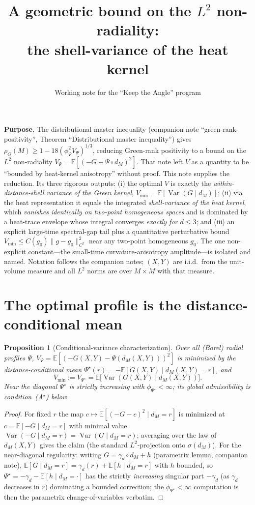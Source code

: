 \documentclass[11pt]{article}
\title{A geometric bound on the $L^2$ non-radiality:\\
the shell-variance of the heat kernel}
\author{Working note for the ``Keep the Angle'' program}
\date{}
\newtheorem{proposition}[theorem]{Proposition}
\theoremstyle{remark}
\newcommand{\dM}{d_M}
\newcommand{\rhoG}{\rho_G}
\newcommand{\Var}{\operatorname{Var}}
\newcommand{\E}{\mathbb E}
\begin{document}
\maketitle

\noindent\textbf{Purpose.} The distributional master inequality (companion note
``green-rank-positivity'', Theorem ``Distributional master inequality'') gives
$\rhoG(M)\ge1-18(\phi_\Psi^2V_\Psi)^{1/3}$, reducing Green-rank positivity to a bound on the
$L^2$ non-radiality $V_\Psi=\E[(-G-\Psi\circ\dM)^2]$. That note left $V$ as a quantity to be
``bounded by heat-kernel anisotropy'' without proof. This note supplies the reduction. Its
three rigorous outputs: (i) the optimal $V$ is exactly the \emph{within-distance-shell
variance of the Green kernel}, $V_{\min}=\E[\Var(G\mid\dM)]$; (ii) via the heat
representation it equals the integrated \emph{shell-variance of the heat kernel}, which
\emph{vanishes identically on two-point homogeneous spaces} and is dominated by a heat-trace
envelope whose integral converges \emph{exactly for $d\le3$}; and (iii) an explicit
large-time spectral-gap tail plus a quantitative perturbative bound
$V_{\min}\le C(g_0)\lVert g-g_0\rVert_{C^2}^2$ near any two-point homogeneous $g_0$. The one
non-explicit constant---the small-time curvature-anisotropy amplitude---is isolated and
named. Notation follows the companion notes; $(X,Y)$ are i.i.d.\ from the unit-volume
measure and all $L^2$ norms are over $M\times M$ with that measure.

\section{The optimal profile is the distance-conditional mean}

\begin{proposition}[Conditional-variance characterization]\label{prop:condvar}
Over all (Borel) radial profiles $\Psi$, $V_\Psi=\E[(-G(X,Y)-\Psi(\dM(X,Y)))^2]$ is minimized
by the distance-conditional mean $\Psi^\star(r)=-\E[G(X,Y)\mid\dM(X,Y)=r]$, and
\[
V_{\min}:=V_{\Psi^\star}=\E\bigl[\Var(G(X,Y)\mid\dM(X,Y))\bigr].
\]
Near the diagonal $\Psi^\star$ is strictly increasing with $\phi_{\Psi^\star}<\infty$; its
global admissibility is condition~\textup{(A$^\star$)} below.
\end{proposition}

\begin{proof}
For fixed $r$ the map $c\mapsto\E[(-G-c)^2\mid\dM=r]$ is minimized at $c=\E[-G\mid\dM=r]$
with minimal value $\Var(-G\mid\dM=r)=\Var(G\mid\dM=r)$; averaging over the law of $\dM(X,Y)$
gives the claim (the standard $L^2$-projection onto $\sigma(\dM)$). For the near-diagonal
regularity: writing $G=\gamma_d\circ\dM+h$ (parametrix lemma, companion note),
$\E[G\mid\dM=r]=\gamma_d(r)+\E[h\mid\dM=r]$ with $h$ bounded, so
$\Psi^\star=-\gamma_d-\E[h\mid\dM=\cdot]$ has the strictly \emph{increasing} singular part
$-\gamma_d$ (as $\gamma_d$ decreases in $r$) dominating a bounded correction; the
$\phi_{\Psi^\star}<\infty$ computation is then the parametrix change-of-variables verbatim.
\end{proof}
\end{document}
